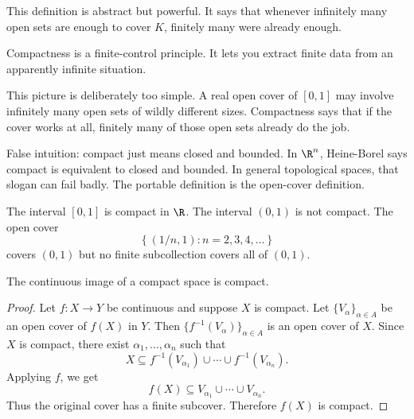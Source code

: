 This definition is abstract but powerful. It says that whenever infinitely many
open sets are enough to cover $K$, finitely many were already enough.

\begin{intuitionbox}
Compactness is a finite-control principle. It lets you extract finite data from
an apparently infinite situation.
\end{intuitionbox}

\begin{center}
\end{center}

This picture is deliberately too simple. A real open cover of $[0,1]$ may involve infinitely many open sets of wildly different sizes. Compactness says that if the cover works at all, finitely many of those open sets already do the job.

\begin{trapbox}
False intuition: compact just means closed and bounded. In $\R^n$, Heine-Borel says compact is equivalent to closed and bounded. In general topological spaces, that slogan can fail badly. The portable definition is the open-cover definition.
\end{trapbox}

\begin{example}
The interval $[0,1]$ is compact in $\R$. The interval $(0,1)$ is not compact.
The open cover
\[
\left\{(1/n,1):n=2,3,4,\ldots\right\}
\]
covers $(0,1)$ but no finite subcollection covers all of $(0,1)$.
\end{example}

\begin{theorem}
The continuous image of a compact space is compact.
\end{theorem}

\begin{proof}
Let $f:X\to Y$ be continuous and suppose $X$ is compact. Let
$\{V_\alpha\}_{\alpha\in A}$ be an open cover of $f(X)$ in $Y$. Then
$\{f^{-1}(V_\alpha)\}_{\alpha\in A}$ is an open cover of $X$. Since $X$ is
compact, there exist $\alpha_1,\ldots,\alpha_n$ such that
\[
X\subseteq f^{-1}(V_{\alpha_1})\cup\cdots\cup f^{-1}(V_{\alpha_n}).
\]
Applying $f$, we get
\[
f(X)\subseteq V_{\alpha_1}\cup\cdots\cup V_{\alpha_n}.
\]
Thus the original cover has a finite subcover. Therefore $f(X)$ is compact.
\end{proof}

